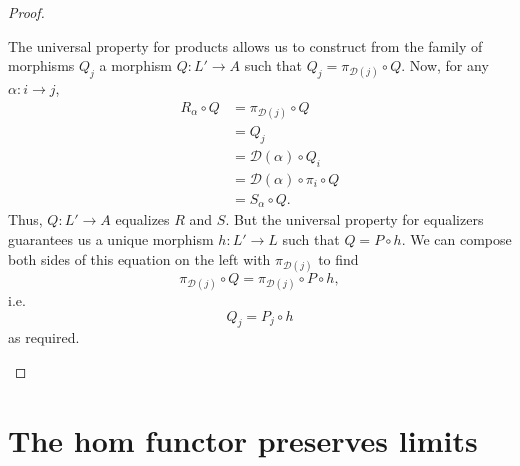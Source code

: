 \documentclass[main.tex]{subfiles}
\begin{document}
\begin{proof}
\begin{enumerate}
      The universal property for products allows us to construct from the family of morphisms $Q_{j}$ a morphism $Q\colon L' \to A$ such that $Q_{j} = \pi_{\mathcal{D}(j)} \circ Q$. Now, for any $\alpha\colon i \to j$,
      \begin{align*}
        R_{\alpha} \circ Q &= \pi_{\mathcal{D}(j)} \circ Q \\
        &= Q_{j} \\
        &= \mathcal{D}(\alpha) \circ Q_{i} \\
        &= \mathcal{D}(\alpha) \circ \pi_{i} \circ Q \\
        &= S_{\alpha} \circ Q.
      \end{align*}
      Thus, $Q\colon L' \to A$ equalizes $R$ and $S$. But the universal property for equalizers guarantees us a unique morphism $h\colon L' \to L$ such that $Q = P \circ h$. We can compose both sides of this equation on the left with $\pi_{\mathcal{D}(j)}$ to find
      \begin{equation*}
        \pi_{\mathcal{D}(j)} \circ Q = \pi_{\mathcal{D}(j)} \circ P \circ h,
      \end{equation*}
      i.e.
      \begin{equation*}
        Q_{j} = P_{j} \circ h
      \end{equation*}
      as required.
  \end{enumerate}
\end{proof}


\section{The hom functor preserves limits}
\end{document}
